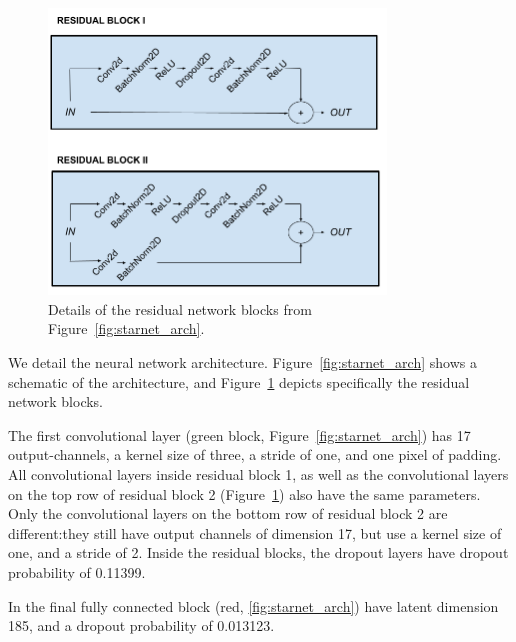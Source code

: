 \begin{figure}[!tb]
    \centering
    \includegraphics[width=0.8\textwidth]{figures/vi_figures/conv_block.png}
    \caption{Details of the residual network blocks from Figure~\ref{fig:starnet_arch}.
    }
    \label{fig:conv_blocks}
\end{figure}


We detail the neural network architecture. 
Figure~\ref{fig:starnet_arch} shows a schematic of the architecture, and 
Figure~\ref{fig:conv_blocks} depicts specifically 
the residual network blocks. 

The first convolutional layer (green block, Figure~\ref{fig:starnet_arch}) has 17 output-channels, a kernel size of three, a stride of one, and one pixel of padding.
All convolutional layers inside residual block 1, as well as the convolutional layers on the top row of residual block 2 (Figure~\ref{fig:conv_blocks}) also have the same parameters. 
Only the convolutional layers on the bottom row of residual block 2 are different:they still have output channels of dimension 17, 
but use a kernel size of one, and a stride of 2. 
Inside the residual blocks, the dropout layers have dropout probability of 0.11399. 

In the final fully connected block (red, \ref{fig:starnet_arch}) have latent dimension 185, and a dropout probability of 0.013123. 

